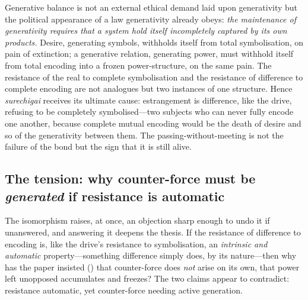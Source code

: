 \begin{claim}
Generative balance is not an external ethical demand laid upon generativity but the political appearance of a law generativity already obeys: \emph{the maintenance of generativity requires that a system hold itself incompletely captured by its own products.} Desire, generating symbols, withholds itself from total symbolisation, on pain of extinction; a generative relation, generating power, must withhold itself from total encoding into a frozen power-structure, on the same pain. The resistance of the real to complete symbolisation and the resistance of difference to complete encoding are not analogues but two instances of one structure. Hence \emph{surechigai} receives its ultimate cause: estrangement is difference, like the drive, refusing to be completely symbolised---two subjects who can never fully encode one another, because complete mutual encoding would be the death of desire and so of the generativity between them. The passing-without-meeting is not the failure of the bond but the sign that it is still alive.
\end{claim}

\subsection{The tension: why counter-force must be \emph{generated} if resistance is automatic}
\label{p17:sub:balance-tension}

The isomorphism raises, at once, an objection sharp enough to undo it if unanswered, and answering it deepens the thesis. If the resistance of difference to encoding is, like the drive's resistance to symbolisation, an \emph{intrinsic and automatic} property---something difference simply does, by its nature---then why has the paper insisted () that counter-force does \emph{not} arise on its own, that power left unopposed accumulates and freezes? The two claims appear to contradict: resistance automatic, yet counter-force needing active generation.

